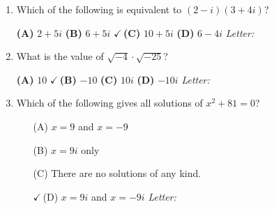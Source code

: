 \documentclass[10pt]{article}
\begin{document}
\begin{enumerate}[leftmargin=1.9em, itemsep=14pt]

\item Which of the following is equivalent to $(2 - i)(3 + 4i)$?

      \smallskip
      \textbf{(A)} $2 + 5i$ \hspace{2.2em} \textbf{(B)} $6 + 5i$ \hspace{2.2em} {\color{keyred}\textbf{$\checkmark$\,(C)}} $10 + 5i$ \hspace{2.2em} \textbf{(D)} $6 - 4i$ \hfill\textit{Letter:}~\gradedblank[id=ap1, type=choice, points=1, answer=C]{0.42in}{13pt}

\item What is the value of $\sqrt{-4}\cdot\sqrt{-25}$?

      \smallskip
      \textbf{(A)} $10$ \hspace{2.2em} {\color{keyred}\textbf{$\checkmark$\,(B)}} $-10$ \hspace{2.2em} \textbf{(C)} $10i$ \hspace{2.2em} \textbf{(D)} $-10i$ \hfill\textit{Letter:}~\gradedblank[id=ap2, type=choice, points=1, answer=B]{0.42in}{13pt}

\item Which of the following gives all solutions of $x^2 + 81 = 0$?
      \begin{enumerate}[leftmargin=2.6em, itemsep=2pt]
        \item[(A)] $x = 9$ and $x = -9$
        \item[(B)] $x = 9i$ only
        \item[(C)] There are no solutions of any kind.
        \item[{\color{keyred}$\checkmark$\,(D)}] $x = 9i$ and $x = -9i$ \hfill\textit{Letter:}~\gradedblank[id=ap3, type=choice, points=1, answer=D]{0.42in}{13pt}
      \end{enumerate}


\end{enumerate}
\end{document}
